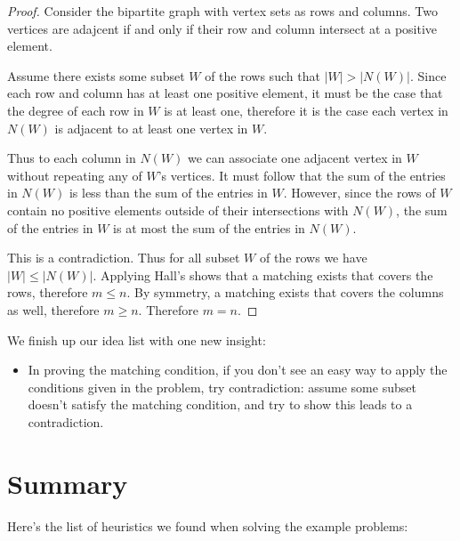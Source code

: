 \documentclass[11pt,paper=letter]{scrartcl}
\begin{document}
\begin{proof}
  Consider the bipartite graph with vertex sets as rows and columns. Two vertices are adajcent if and only if their row and column intersect at a positive element. 

  Assume there exists some subset $W$ of the rows such that $|W| > |N(W)|$. Since each row and column has at least one positive element, it must be the case that the degree of each row in $W$ is at least one, therefore it is the case each vertex in $N(W)$ is adjacent to at least one vertex in $W$.

  Thus to each column in $N(W)$ we can associate one adjacent vertex in $W$ without repeating any of $W$'s vertices. It must follow that the sum of the entries in $N(W)$ is less than the sum of the entries in $W$. However, since the rows of $W$ contain no positive elements outside of their intersections with $N(W)$, the sum of the entries in $W$ is at most the sum of the entries in $N(W)$.

  This is a contradiction. Thus for all subset $W$ of the rows we have $|W| \leq |N(W)|$. Applying Hall's shows that a matching exists that covers the rows, therefore $m \leq n$. By symmetry, a matching exists that covers the columns as well, therefore $m \geq n$. Therefore $m = n$.
\end{proof}

We finish up our idea list with one new insight:

\begin{itemize}
  \item In proving the matching condition, if you don't see an easy way to apply the conditions given in the problem, try contradiction: assume some subset doesn't satisfy the matching condition, and try to show this leads to a contradiction.
\end{itemize}

\section{Summary}

Here's the list of heuristics we found when solving the example problems:
\end{document}
